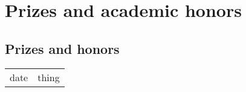 \chapter{Prizes and academic honors}

\section{Prizes and honors}

\begin{tabular}[l]{ p{} p{} }

date & thing\\

\end{tabular} 